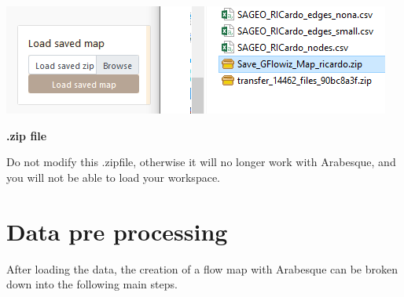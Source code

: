 \documentclass[
  letterpaper,
  DIV=11,
  numbers=noendperiod]{scrreprt}
\begin{document}
\includegraphics{images/import_zipfile.png}

\begin{tcolorbox}[enhanced jigsaw, rightrule=.15mm, bottomrule=.15mm, colback=white, breakable, opacityback=0, colframe=quarto-callout-warning-color-frame, toprule=.15mm, leftrule=.75mm, arc=.35mm, left=2mm]
\begin{minipage}[t]{5.5mm}
\textcolor{quarto-callout-warning-color}{\faExclamationTriangle}
\end{minipage}%
\begin{minipage}[t]{\textwidth - 5.5mm}

\vspace{-3mm}\textbf{.zip file}\vspace{3mm}

Do not modify this .zipfile, otherwise it will no longer work with
Arabesque, and you will not be able to load your workspace.

\end{minipage}%
\end{tcolorbox}


\chapter{Data pre processing}\label{data-pre-processing}

After loading the data, the creation of a flow map with Arabesque can be
broken down into the following main steps.
\end{document}
